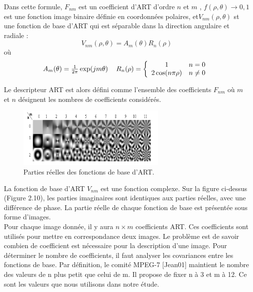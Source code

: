 Dans cette formule, $ F_{nm} $ est un coefficient d’ART d’ordre $ n $ et $ m $ , $ f(\rho, \theta) \longrightarrow {0,1} $ est une fonction image binaire définie en coordonnées polaires, et$  V_{nm}(\rho, \theta) $ st une fonction de base d’ART qui est séparable dans la direction angulaire et radiale :
\begin{equation}
	V_{nm}(\rho, \theta)= A_m(\theta) R_n(\rho) 
\end{equation}
où
\begin{equation}
\begin{tabular}{cc}
 $ A_m(\theta) =\frac{1}{2\pi}\exp(jm\theta) $ 
    & $ R_n(\rho) = \left\{
    \begin{array}{cc} 
    1 & n=0 \\ 2\cos( n \pi \rho) 
    & n \neq 0  \end{array} \right. $ 
\end{tabular}
\end{equation}

Le descripteur ART est alors défini comme l’ensemble des coefficients $ F_{nm} $ où $ m $ et $ n $ désignent les nombres de coefficients considérés.

 \begin{figure}[H]
	\label{fig:art}
	\centering
	\includegraphics[width=0.65\textwidth]{Figures/art} %
	
	\caption{Parties réelles des fonctions de base d’ART.}
	
\end{figure}

La fonction de base d’ART $ V_{nm} $ est une fonction complexe. Sur la figure ci-dessus (Figure 2.10), les parties imaginaires sont identiques aux parties réelles, avec une différence de phase. La partie réelle de chaque fonction de base est présentée sous forme d’images.\\

Pour chaque image donnée, il y aura $ n \times m $  coefficients ART. Ces coefficients sont utilisés pour mettre en correspondance deux images. Le problème est de savoir combien de coefficient est nécessaire pour la description d’une image. Pour déterminer le nombre de coefficients, il faut analyser les covariances entre les fonctions de base. Par définition, le comité MPEG-7 [Jean01] maintient le nombre des valeurs de n plus petit que celui de m. Il propose de fixer n à 3 et m à 12. Ce sont les valeurs que nous utilisons dans notre étude.\\


